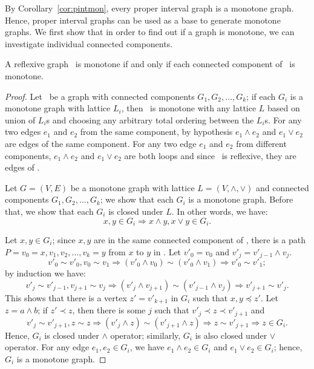 By Corollary~\ref{cor:pintmon}, every proper interval graph is a monotone graph.
Hence, proper interval graphs can be used as a base to generate monotone graphs.
We first show that in order to find out if a graph is monotone, we can 
investigate individual connected components.

\begin{lemma} \label{lem:monotone:con}
A reflexive graph \mG\ is monotone if and only if each connected component of \mG\ is monotone.
\end{lemma}

\begin{proof}
Let \mG\  be a graph with connected components \(G_1,G_2,\dotsc,G_k\);
if each \(G_i\) is a monotone graph with lattice \(L_i\),
then \mG\ is monotone with any lattice \(L\) based on union of \(L_i\)s
and choosing any arbitrary total ordering between the \(L_i\)s\@.
For any two edges \(e_1\) and \(e_2\) from the same component,
by hypothesis \(e_1\wedge e_2\) and \(e_1\vee e_2\) are
edges of the same component.
For any two edge \(e_1\) and \(e_2\) from different components,
\(e_1\wedge e_2\) and \(e_1\vee e_2\) are both loops and since \mG\ is reflexive,
they are edges of \mG\@.

Let \(G=(V,E)\) be a monotone graph with lattice \(L=(V,\wedge,\vee)\) and connected components \(G_1,G_2,\dotsc,G_k\);
we show that each \(G_i\) is a monotone graph. Before that, we show that each \(G_i\) is closed under \(L\)\@.
In other words, we have: \[x,y\in G_i \Rightarrow x\wedge y, x\vee y \in G_i.\]

Let \(x, y\in G_i\);
since \(x,y\) are in the same connected component of \mG, there is a path \(P=v_0=x,v_1,v_2,\dotsc,v_k=y\)
from \(x\) to \(y\) in \mG\@. Let \(v'_0 = v_0\) and \(v'_j = v'_{j-1} \wedge v_j\)\@.
\[v'_0 \sim v'_0, v_0\sim v_1 \Rightarrow (v'_0 \wedge v_0) \sim (v'_0 \wedge v_1) \Rightarrow v'_0 \sim v'_1;\]
by induction we have:
\[v'_j \sim v'_{j-1}, v_{j+1} \sim v_j \Rightarrow (v'_j \wedge v_{j+1}) \sim (v'_{j-1} \wedge v_j) \Rightarrow v'_{j+1} \sim v'_j.\]
This shows that there is a vertex \(z'=v'_{k+1}\) in \(G_i\) such that \(x,y\preceq z'\)\@.
Let \(z = a\wedge b\); if \(z' \prec z\), then there is some \(j\) such that \(v'_j \prec z \prec v'_{j+1}\) and 
\[v'_j\sim v'_{j+1}, z \sim z \Rightarrow (v'_j \wedge z) \sim (v'_{j+1} \wedge z) \Rightarrow z \sim v'_{j+1} \Rightarrow z \in G_i.\]
Hence, \(G_i\) is closed under \(\wedge\) operator; similarly, \(G_i\) is also closed under \(\vee\) operator.
For any edge \(e_1,e_2\in G_i\), we have \(e_1\wedge e_2\in G_i\) and \(e_1\vee e_2 \in G_i\); hence, \(G_i\) is a monotone graph.
\end{proof}

